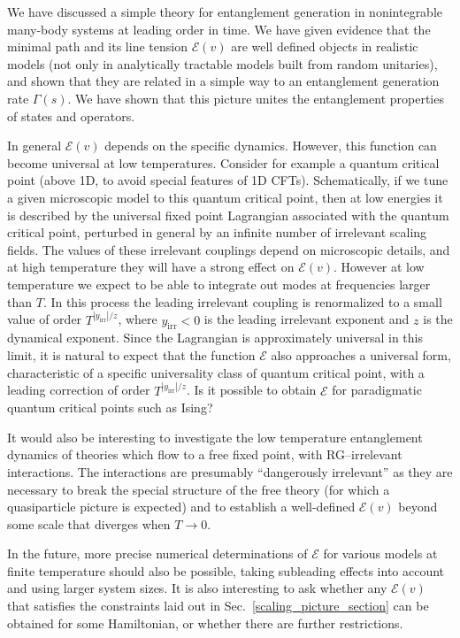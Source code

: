 \documentclass[aps,prx,twocolumn,superscriptaddress,floatfix,nofootinbib,prx]{revtex4}
\renewcommand{\>}{\right\rangle}
\newcommand{\<}{\left\langle}
\newcommand{\lt}{\mathcal{E}}
\begin{document}
We have discussed a simple theory for entanglement generation in nonintegrable many-body systems at leading order in time.
We have given evidence that the minimal path and its line tension $\lt(v)$ are well defined objects in realistic models (not only in analytically tractable models built from random unitaries), and shown that they are related in a simple way to an entanglement generation rate $\Gamma(s)$.
We have shown that this picture unites the entanglement properties of states and operators. 

In general $\lt(v)$ depends on the specific dynamics. However, this function can become universal at low temperatures. Consider for example a quantum critical point (above 1D, to avoid special features of 1D CFTs). Schematically, if we tune a given microscopic model to this quantum critical point, then at low energies it is described by the universal fixed point Lagrangian associated with the quantum critical point, perturbed in general by an infinite number of irrelevant scaling fields. The values of these irrelevant couplings depend on microscopic details, and at high temperature they will have a strong effect on $\lt(v)$. However at low temperature we expect to be able to integrate out modes at frequencies larger than $T$. In this process the leading irrelevant coupling is renormalized to a small value of order $T^{|y_\text{irr}|/z}$, where $y_\text{irr} <0$ is the leading irrelevant exponent and $z$ is the dynamical exponent. Since the Lagrangian is approximately universal in this limit,  it is natural to expect that the function $\lt$ also approaches a universal form, characteristic of a specific universality class of quantum critical point, with a leading correction of order $T^{|y_\text{irr}|/z}$. Is it possible to obtain $\lt$ for paradigmatic quantum critical points such as Ising? 

It would also be interesting to investigate the low temperature entanglement dynamics of theories which flow to a free fixed point, with RG--irrelevant interactions.
 The  interactions are presumably ``dangerously irrelevant'' as 
they are necessary to break the special structure of the free theory (for which a quasiparticle picture is expected) and to establish a well-defined $\lt(v)$ beyond some scale that diverges when $T\rightarrow 0$.


In the future, more precise numerical determinations of $\lt$ for various models at finite temperature should also be possible,  taking subleading effects into account and using larger system sizes. 
 It is also interesting to ask whether  any $\lt(v)$ that satisfies the constraints laid out in Sec.~\ref{scaling_picture_section} can be obtained for some Hamiltonian, or whether there are further restrictions.
\end{document}
